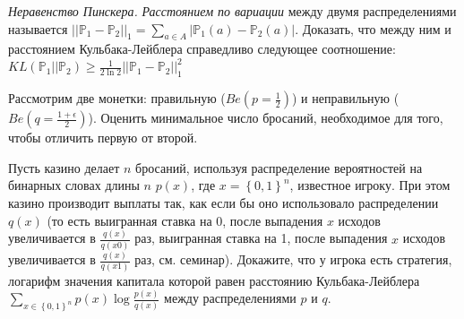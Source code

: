 \begin{problem}\textit{Неравенство Пинскера.} 
\textit{Расстоянием по вариации} между двумя распределениями называется $||\mathbb{P}_1 - \mathbb{P}_2||_1 = \sum_{a \in A} |\mathbb{P}_1(a) - \mathbb{P}_2(a)|$. Доказать, что между ним и расстоянием Кульбака-Лейблера справедливо следующее соотношение:\\
$KL(\mathbb{P}_1||\mathbb{P}_2) \geq \frac{1}{2\ln2} ||\mathbb{P}_1 - \mathbb{P}_2||_1^2$
\end{problem}

\begin{problem}
Рассмотрим две монетки: правильную ($Be(p = \frac{1}{2})$) и неправильную ($Be(q = \frac{1 +\epsilon}{2})$). Оценить минимальное число бросаний, необходимое для того, чтобы отличить первую от второй.
\end{problem}
\begin{comment}
\begin{remark} Необходимость построения нижних оценок возникает тогда, когда случайная последовательность генерируется одним из распределений $\{P_i\}$ (неизвестно каким), а наилучшая стратегия игрока зависит от вида истинного $P_k \in \{P_i\}$, о котором нет никакой информации  . 
\end{remark}
\end{comment}
\begin{problem}
Пусть казино делает $n$ бросаний, используя распределение вероятностей на бинарных словах длины $n$ $p\left(x\right)$, где $x=\left\{0,1\right\}^{n} $, известное игроку. При этом казино производит выплаты так, как если бы оно использовало распределении $q\left(x\right)$ (то есть выигранная ставка на 0, после выпадения $x$ исходов увеличивается в $\frac{q\left(x\right)}{q\left(x0\right)} $ раз, выигранная ставка на 1, после выпадения $x$ исходов увеличивается в $\frac{q\left(x\right)}{q\left(x1\right)} $ раз, см. семинар). Докажите, что у игрока есть стратегия, логарифм значения капитала которой равен расстоянию Кульбака-Лейблера $\sum _{x\in \left\{0,1\right\}^{n} }p\left(x\right)\log \frac{p\left(x\right)}{q\left(x\right)}  $ между распределениями $p$ и $q$.
\end{problem}

\begin{comment}
\begin{problem} \textit{Неравенство больших уклонений}
Рассмотрим последовательность незовисимых одинаково распределенных случайных величин $X_1, ..., X_n$, $X_i~Be(q)$. Доказать, что $-\frac{1}{n}\log \mathbb{P}(\frac{1}{n}\sum X_i \geq p) \rightarrow p\log \frac{p}{q} + (1-p)\log \frac{1-p}{1-q} = KL((p, 1-p)||(q, 1-q))$.
\begin{ordre}
\end{ordre}
\end{problem}

\begin{remark} 
Этот результат является следствием теоремы Санова, которая позволяет оценивать вероятности больших уклонений.. Приведем ниже её упрощенную формулировку.\\
\textit{Теорема Санова}
\end{remark}

\end{comment}


